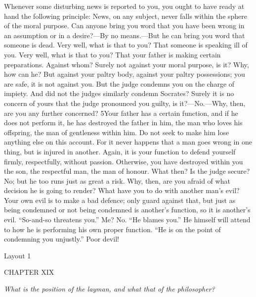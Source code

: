 Whenever some disturbing news is reported to you, you ought to have ready at hand the following principle: News, on any subject, never falls within the sphere of the moral purpose. Can anyone bring you word that you have been wrong in an assumption or in a desire?—By no means.—But he can bring you word that someone is dead. Very well, what is that to you? That someone is speaking ill of you. Very well, what is that to you? That your father is making certain preparations. Against whom? Surely not against your moral purpose, is it? Why, how can he? But against your paltry body, against your paltry possessions; you are safe, it is not against you. But the judge condemns you on the charge of impiety. And did not the judges similarly condemn Socrates? Surely it is no concern of yours that the judge pronounced you guilty, is it?—No.—Why, then, are you any further concerned? 5Your father has a certain function, and if he does not perform it, he has destroyed the father in him, the man who loves his offspring, the man of gentleness within him. Do not seek to make him lose anything else on this account. For it never happens that a man goes wrong in one thing, but is injured in another. Again, it is your function to defend yourself firmly, respectfully, without passion. Otherwise, you have destroyed within you the son, the respectful man, the man of honour. What then? Is the judge secure? No; but he too runs just as great a risk. Why, then, are you afraid of what decision he is going to render? What have you to do with another man's evil? Your own evil is to make a bad defence; only guard against that, but just as being condemned or not being condemned is another's function, so it is another's evil. ``So-and-so threatens you.'' Me? No. ``He blames you.'' He himself will attend to how he is performing his own proper function. ``He is on the point of condemning you unjustly.'' Poor devil!



Layout 1

CHAPTER XIX

\emph{What is the position of the layman, and what that of the philosopher?}


